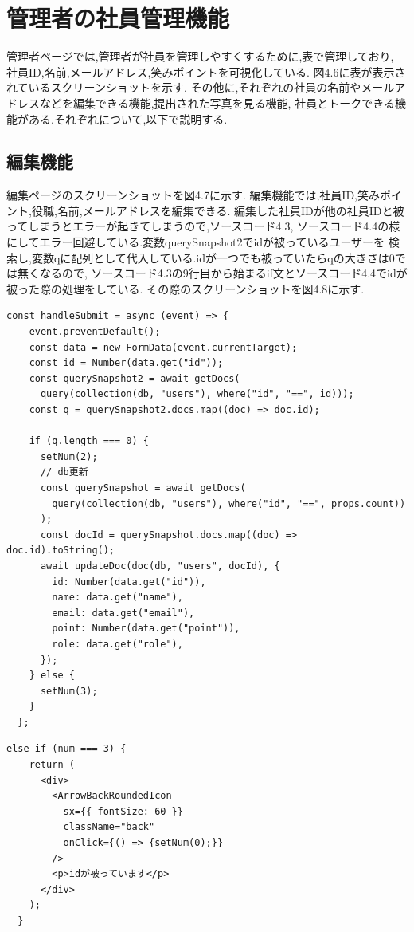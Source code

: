 \section{管理者の社員管理機能}
\label{chp:tex_admin}
管理者ページでは,管理者が社員を管理しやすくするために,表で管理しており,
社員ID,名前,メールアドレス,笑みポイントを可視化している.
図4.6に表が表示されているスクリーンショットを示す.
その他に,それぞれの社員の名前やメールアドレスなどを編集できる機能,提出された写真を見る機能,
社員とトークできる機能がある.それぞれについて,以下で説明する.

\subsection{編集機能}
編集ページのスクリーンショットを図4.7に示す.
編集機能では,社員ID,笑みポイント,役職,名前,メールアドレスを編集できる.
編集した社員IDが他の社員IDと被ってしまうとエラーが起きてしまうので,ソースコード4.3,
ソースコード4.4の様にしてエラー回避している.変数querySnapshot2でidが被っているユーザーを
検索し,変数qに配列として代入している.idが一つでも被っていたらqの大きさは0では無くなるので,
ソースコード4.3の9行目から始まるif文とソースコード4.4でidが被った際の処理をしている.
その際のスクリーンショットを図4.8に示す.

\begin{lstlisting}[caption=社員IDが被った時の処理]
  const handleSubmit = async (event) => {
    event.preventDefault();
    const data = new FormData(event.currentTarget);
    const id = Number(data.get("id"));
    const querySnapshot2 = await getDocs(
      query(collection(db, "users"), where("id", "==", id)));
    const q = querySnapshot2.docs.map((doc) => doc.id);

    if (q.length === 0) {
      setNum(2);
      // db更新
      const querySnapshot = await getDocs(
        query(collection(db, "users"), where("id", "==", props.count))
      );
      const docId = querySnapshot.docs.map((doc) => doc.id).toString();
      await updateDoc(doc(db, "users", docId), {
        id: Number(data.get("id")),
        name: data.get("name"),
        email: data.get("email"),
        point: Number(data.get("point")),
        role: data.get("role"),
      });
    } else {
      setNum(3);
    }
  };
\end{lstlisting}

\begin{lstlisting}[caption=社員IDが被った時の処理]
  else if (num === 3) {
    return (
      <div>
        <ArrowBackRoundedIcon
          sx={{ fontSize: 60 }}
          className="back"
          onClick={() => {setNum(0);}}
        />
        <p>idが被っています</p>
      </div>
    );
  }
\end{lstlisting}

